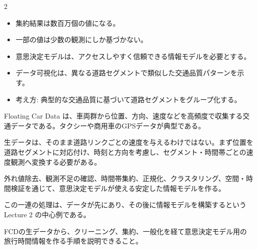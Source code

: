 \begin{multicols}{2}

\footnotesize

\raggedcolumns


\begin{itemize}
\item 集約結果は数百万個の値になる。
\item 一部の値は少数の観測にしか基づかない。
\item 意思決定モデルは、アクセスしやすく信頼できる情報モデルを必要とする。
\item データ可視化は、異なる道路セグメントで類似した交通品質パターンを示す。
\item 考え方: 典型的な交通品質に基づいて道路セグメントをグループ化する。
\end{itemize}

Floating Car Data は、車両群から位置、方向、速度などを高頻度で収集する交通データである。タクシーや商用車のGPSデータが典型である。\par

生データは、そのまま道路リンクごとの速度を与えるわけではない。まず位置を道路セグメントに対応付け、時刻と方向を考慮し、セグメント・時間帯ごとの速度観測へ変換する必要がある。\par

外れ値除去、観測不足の確認、時間帯集約、正規化、クラスタリング、空間・時間検証を通じて、意思決定モデルが使える安定した情報モデルを作る。\par

この一連の処理は、データが先にあり、その後に情報モデルを構築するという Lecture 2 の中心例である。\par

FCDの生データから、クリーニング、集約、一般化を経て意思決定モデル用の旅行時間情報を作る手順を説明できること。\par



\end{multicols}
